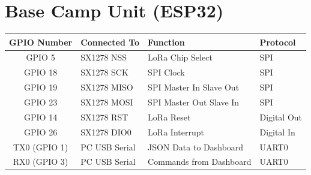 \section{Base Camp Unit (ESP32)}
\begin{table}[htbp]
    \centering
    \begin{tabular}{clll}
        \toprule
        \textbf{GPIO Number} & \textbf{Connected To} & \textbf{Function} & \textbf{Protocol} \\
        \midrule
        GPIO 5  & SX1278 NSS & LoRa Chip Select & SPI \\
        GPIO 18 & SX1278 SCK & SPI Clock & SPI \\
        GPIO 19 & SX1278 MISO & SPI Master In Slave Out & SPI \\
        GPIO 23 & SX1278 MOSI & SPI Master Out Slave In & SPI \\
        GPIO 14 & SX1278 RST & LoRa Reset & Digital Out \\
        GPIO 26 & SX1278 DIO0 & LoRa Interrupt & Digital In \\
        TX0 (GPIO 1)& PC USB Serial & JSON Data to Dashboard & UART0 \\
        RX0 (GPIO 3)& PC USB Serial & Commands from Dashboard& UART0 \\
        \bottomrule
    \end{tabular}
\end{table}
